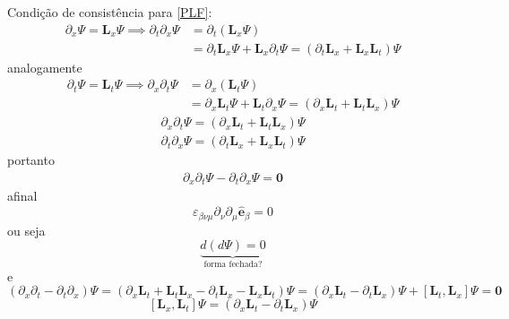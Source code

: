\documentclass[25pt]{article}
\numberwithin{equation}{subsection} %
\newcommand{\commutador}[2]{\left[#1,#2\right]}
\begin{document}
Condição de consistência para \ref{PLF}:
\begin{align}
\partial_x\bm{\varPsi}=\mathbf{L}_x\bm{\varPsi}\implies \partial_t\partial_x\bm{\varPsi}&=\partial_t\left(\mathbf{L}_x\bm{\varPsi}\right)\\
&=\partial_t\mathbf{L}_x\bm{\varPsi}+\mathbf{L}_x\partial_t\bm{\varPsi}=\left(\partial_t\mathbf{L}_x+\mathbf{L}_x\mathbf{L}_t\right)\bm{\varPsi}
\end{align}
analogamente
\begin{align}
\partial_t\bm{\varPsi}=\mathbf{L}_t\bm{\varPsi}\implies \partial_x\partial_t\bm{\varPsi}&=\partial_x\left(\mathbf{L}_t\bm{\varPsi}\right)\\
&=\partial_x\mathbf{L}_t\bm{\varPsi}+\mathbf{L}_t\partial_x\bm{\varPsi}=\left(\partial_x\mathbf{L}_t+\mathbf{L}_t\mathbf{L}_x\right)\bm{\varPsi}
\end{align}
\begin{equation}
\boxed{\boxed{\begin{array}{c}
		\displaystyle \partial_x\partial_t\bm{\varPsi}=\left(\partial_x\mathbf{L}_t+\mathbf{L}_t\mathbf{L}_x\right)\bm{\varPsi}\\
		\partial_t\partial_x\bm{\varPsi}=\left(\partial_t\mathbf{L}_x+\mathbf{L}_x\mathbf{L}_t\right)\bm{\varPsi}
		\end{array}}}
\end{equation}
portanto
\begin{align}
\partial_x\partial_t\bm{\varPsi}-\partial_t\partial_x\bm{\varPsi}=\mathbf{0}
\end{align}
afinal
\begin{equation}
\varepsilon_{\beta\nu\mu}\partial_\nu\partial_\mu\mathbf{\hat{e}}_{\beta}=0
\end{equation}
ou seja
\color{red}
\begin{equation}
\underbrace{d\left(d\bm{\varPsi}\right)=0}_{\text{forma fechada?}}
\end{equation}
\color{black}
e
\begin{equation}
\left(\partial_x\partial_t-\partial_t\partial_x\right)\bm{\varPsi}=\left(\partial_x\mathbf{L}_t+\mathbf{L}_t\mathbf{L}_x-\partial_t\mathbf{L}_x-\mathbf{L}_x\mathbf{L}_t\right)\bm{\varPsi}=\left(\partial_x\mathbf{L}_t-\partial_t\mathbf{L}_x\right)\bm{\varPsi}+\commutador{\mathbf{L}_t}{\mathbf{L}_x}\bm{\varPsi}=\mathbf{0}
\end{equation}
\begin{equation}
\boxed{\boxed{\commutador{\mathbf{L}_x}{\mathbf{L}_t}\bm{\varPsi}=\left(\partial_x\mathbf{L}_t-\partial_t\mathbf{L}_x\right)\bm{\varPsi}}}
\end{equation}
\end{document}

